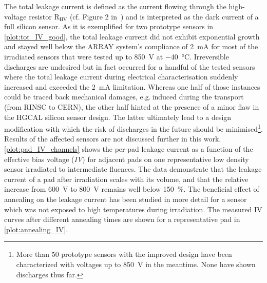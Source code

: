The total leakage current is defined as the current flowing through the high-voltage resistor R$_\text{HV}$ (cf. Figure 2 in~\cite{pitters:array2019}) and is interpreted as the dark current of a full silicon sensor.
As it is exemplified for two prototype sensors in \ref{plot:tot_IV_good}, the total leakage current did not exhibit exponential growth and stayed well below the ARRAY system's compliance of \SI{2}{\milli\ampere} for most of the irradiated sensors that were tested up to \SI{850}{\volt} at \SI{-40}{\celsius}.
Irreversible discharges are undesired but in fact occurred for a handful of the tested sensors where the total leakage current during electrical characterisation suddenly increased and exceeded the \SI{2}{\milli\ampere} limitation.
Whereas one half of those instances could be traced back mechanical damages, e.g.$~$induced during the transport (from RINSC to CERN), the other half hinted at the presence of a minor flaw in the HGCAL silicon sensor design.
The latter ultimately lead to a design modification with which the risk of discharges in the future should be minimised\footnote{More than 50 prototype sensors with the improved design have been characterized with voltages up to \SI{850}{\volt} in the meantime. None have shown discharges thus far.}.
Results of the affected sensors are not discussed further in this work.
\ref{plot:pad_IV_channels} shows the per-pad leakage current as a function of the effective bias voltage (\emph{IV}) for adjacent pads on one representative low density sensor irradiated to intermediate fluences.
The data demonstrate that the leakage current of a pad after irradiation scales with its volume, and that the relative increase from \SI{600}{\volt} to \SI{800}{\volt} remains well below \SI{150}{\percent}.
The beneficial effect of annealing on the leakage current has been studied in more detail for a sensor which was not exposed to high temperatures during irradiation.
The measured IV curves after different annealing times are shown for a representative pad in \ref{plot:annealing_IV}.
